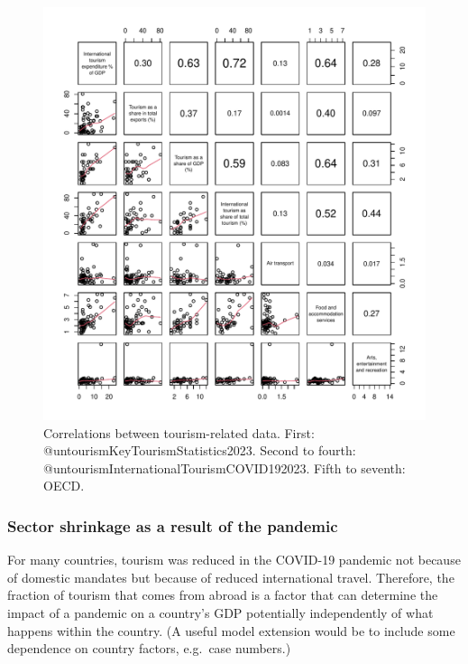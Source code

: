 \documentclass[
]{article}
\begin{document}
\begin{figure}

{\centering \includegraphics{README_files/figure-latex/pairs-1} 

}

\caption{Correlations between tourism-related data. First: @untourismKeyTourismStatistics2023. Second to fourth: @untourismInternationalTourismCOVID192023. Fifth to seventh: OECD.}\label{fig:pairs}
\end{figure}

\newpage

\subsubsection{Sector shrinkage as a result of the pandemic}\label{sector-shrinkage-as-a-result-of-the-pandemic}

For many countries, tourism was reduced in the COVID-19 pandemic not because of domestic mandates but because of reduced international travel. Therefore, the fraction of tourism that comes from abroad is a factor that can determine the impact of a pandemic on a country's GDP potentially independently of what happens within the country. (A useful model extension would be to include some dependence on country factors, e.g.~case numbers.)
\end{document}
